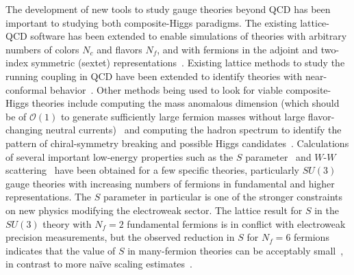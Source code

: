 \begin{itemize}
The development of new tools to study gauge theories beyond QCD has been important to studying both composite-Higgs paradigms.  The existing lattice-QCD software has been extended to enable simulations of theories with arbitrary numbers of colors $N_c$ and flavors $N_f$, and with fermions in the adjoint and two-index symmetric (sextet) representations~\cite{DelDebbio:2010hu,Fodor:2012ni,DeGrand:2013uha}.  Existing lattice methods to study the running coupling in QCD have been extended to identify theories with near-conformal behavior~\cite{Appelquist:2007hu,Appelquist:2009ty,Bilgici:2009nm,Hasenfratz:2010fi,Fodor:2012td}.  Other methods being used to look for viable composite-Higgs theories include computing the mass anomalous dimension (which should be of ${\mathcal O}(1)$ to generate sufficiently large fermion masses without large flavor-changing neutral currents)~\cite{Bursa:2010xr,Appelquist:2011dp,Cheng:2013eu,DeGrand:2013uha} and computing the hadron spectrum to identify the pattern of chiral-symmetry breaking and possible Higgs candidates~\cite{Appelquist:2010xv,Fodor:2012et,Fodor:2012ty,Aoki:2013zsa}.  Calculations of several important low-energy properties such as the $S$ parameter~\cite{Appelquist:2010xv} and $W$-$W$ scattering~\cite{Appelquist:2012sm} have been obtained for a few specific theories, particularly $SU(3)$ gauge theories with increasing numbers of fermions in fundamental and higher representations.  The $S$ parameter in particular is one of the stronger constraints on new physics modifying the
electroweak sector. The lattice result for $S$ in the $SU(3)$ theory with $N_f=2$ fundamental fermions is in conflict with electroweak precision measurements, but the observed reduction in $S$ for $N_f = 6$ fermions indicates that the value of $S$ in many-fermion theories can be acceptably small~\cite{Appelquist:2010xv}, in contrast to more na{\"i}ve scaling estimates~\cite{Peskin:1990zt}.  


\end{itemize}
